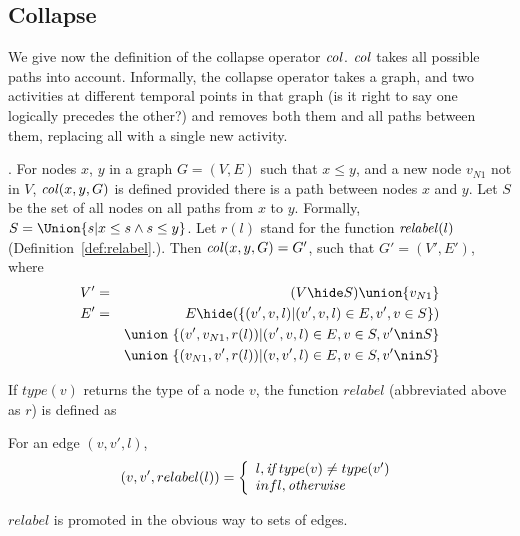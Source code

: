 \documentclass{elsarticle}
\begin{document}
\subsection{Collapse}

We give now the definition of the collapse operator $\col$. $\col$ takes  all possible paths into account.
%
Informally, the collapse operator takes a graph, and two activities at different temporal points in that graph (is it right to say one logically precedes the other?) and removes both them and all paths between them, replacing all with a single new activity. 


\begin{definition}[$\col$]  \label{def:col}
.  For nodes $x$, $y$ in a graph $G = (V,E)$ such that $x \le y$, and a new node $v_{N1}$ not in $V$,  $\mathit{col}(x,y,G)$ is defined provided there is a path between nodes $x$ and $y$. Let $S$ be the set of all nodes on all paths from $x$ to $y$.
  Formally, $S=\Union \{s|x \le s \land s \le y\}$.
  Let $r(l)$ stand for the function $\mathit{relabel}(l)$ (Definition~\ref{def:relabel}.). Then $\mathit{col}(x,y,G) =  G'$, such that $G'=(V',E')$, where 
  \begin{eqnarray*}
  V' & = & (V\hide S) \union \{v_{N1}\}     \\
  E' & = &  E\hide (
                   \{(v',v,l)| (v',v,l) \in E, v',v \in S\}
                  )\\
  && \union\ \{(v',v_{N1},r(l))|(v',v,l) \in E, v\in S, v'\nin S\}\\
                   && \union\ \{(v_{N1},v',r(l))|(v,v',l) \in E, v\in S, v' \nin S\}\\
  \end{eqnarray*}
\end{definition}
If $type(v)$ returns the type of a node $v$, the function $relabel$ (abbreviated above as $r$) is defined as 
\begin{definition}[$relabel$] \label{def:relabel}
  For an edge $(v,v',l)$, 
  \[
   (v,v',relabel(l)) = \left\{
   \begin{array}{l}
      l,    {\emph{if}}\; type(v) \neq type(v') \\
      infl, \emph{otherwise}
   \end{array}   \right.
  \]
\end{definition}
\noindent
$relabel$ is promoted in the obvious way to sets of edges.
\end{document}
